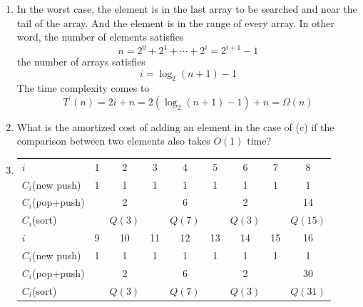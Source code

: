 \documentclass[12pt,a4paper]{article}
\makeatletter
\newtheorem*{solution}{Solution}
\theoremstyle{definition}
\renewenvironment{solution}[1][Solution] {\par\pushQED{\qed}\normalfont\topsep6\p@\@plus6\p@\relax\trivlist\item[\hskip\labelsep\bfseries#1\@addpunct{.}]\ignorespaces}{\popQED\endtrivlist\@endpefalse} \makeatother
\makeatother
\begin{document}
\begin{enumerate}
\begin{enumerate}
\begin{solution}
\begin{tcolorbox}[skin=mycross]
			In the worst case, the element is in the last array to be searched and near the tail of the array. And the element is in the range of every array. In other word, the number of elements satisfies
			\begin{equation*}
				n = 2^0 + 2^1 + \cdots + 2^i = 2^{i+1}-1
			\end{equation*}
			the number of arrays satisfies
			\begin{equation*}
				i = \log_2 (n+1)-1
			\end{equation*}
			The time complexity comes to
			\begin{equation*}
				T^\prime(n) = 2i + n = 2(\log_2(n+1)-1) + n = \Omega(n)
			\end{equation*}
			
		\end{tcolorbox}
		\end{solution}

		\item What is the amortized cost of adding an element in the case of (c) if the comparison between two elements also takes $O(1)$ time?
		
		\begin{solution}

			
			\begin{table}[H]
				\centering
				\begin{tabular}{l|cccccccc}
					\hline
					$i$ 			& 1 & 2 & 3 & 4 & 5 & 6 & 7 & 8 \\
					$C_i$(new push) 	& 1 & 1 & 1 & 1 & 1 & 1 & 1 & 1 \\
					$C_i$(pop+push)	&   & 2 &   & 6 &   & 2 &   & 14\\
					$C_i$(sort) 	& 	& $Q(3)$ & 	& $Q(7)$ &   & $Q(3)$ &   & $Q(15)$ \\
					\hline
					$i$ 			& 9 & 10& 11& 12& 13& 14& 15& 16\\
					$C_i$(new push) 	& 1 & 1 & 1 & 1 & 1 & 1 & 1 & 1 \\
					$C_i$(pop+push)	&   & 2 &   & 6 &   & 2 &   & 30\\
					$C_i$(sort)		& 	& $Q(3)$ & 	& $Q(7)$ & 	& $Q(3)$ & 	& $Q(31)$\\
					\hline
				\end{tabular}
			\end{table}



\end{solution}
\end{enumerate}
\end{enumerate}
\end{document}
